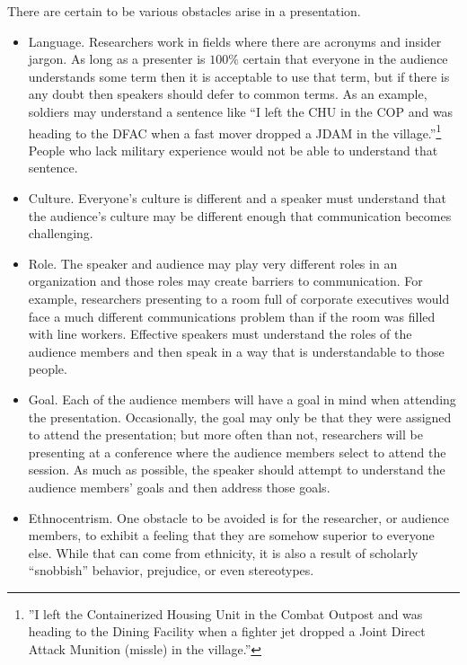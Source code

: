 There are certain to be various obstacles arise in a presentation.

\begin{itemize}
	\item Language. Researchers work in fields where there are acronyms and insider jargon. As long as a presenter is $ 100\% $ certain that everyone in the audience understands some term then it is acceptable to use that term, but if there is any doubt then speakers should defer to common terms. As an example, soldiers may understand a sentence like ``I left the CHU in the COP and was heading to the DFAC when a fast mover dropped a JDAM in the village.''{\footnote{''I left the Containerized Housing Unit in the Combat Outpost and was heading to the Dining Facility when a fighter jet dropped a Joint Direct Attack Munition (missle) in the village.''}} People who lack military experience would not be able to understand that sentence.
	
	\item Culture. Everyone's culture is different and a speaker must understand that the audience's culture may be different enough that communication becomes challenging.

	\item Role. The speaker and audience may play very different roles in an organization and those roles may create barriers to communication. For example, researchers presenting to a room full of corporate executives would face a much different communications problem than if the room was filled with line workers. Effective speakers must understand the roles of the audience members and then speak in a way that is understandable to those people.
	
	\item Goal. Each of the audience members will have a goal in mind when attending the presentation. Occasionally, the goal may only be that they were assigned to attend the presentation; but more often than not, researchers will be presenting at a conference where the audience members select to attend the session. As much as possible, the speaker should attempt to understand the audience members' goals and then address those goals.
	
	\item Ethnocentrism. One obstacle to be avoided is for the researcher, or audience members, to exhibit a feeling that they are somehow superior to everyone else. While that can come from ethnicity, it is also a result of scholarly ``snobbish'' behavior, prejudice, or even stereotypes.
	
\end{itemize}

